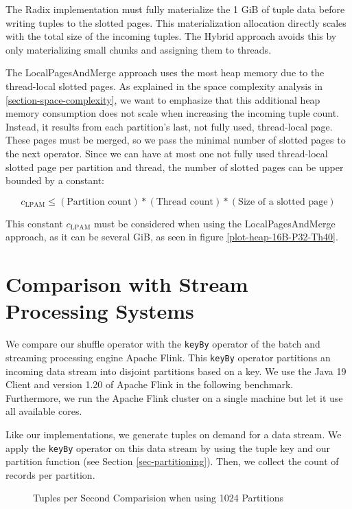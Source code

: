 The Radix implementation must fully materialize the 1 GiB of tuple data before writing tuples to the slotted pages.
This materialization allocation directly scales with the total size of the incoming tuples.
The Hybrid approach avoids this by only materializing small chunks and assigning them to threads.

The LocalPagesAndMerge approach uses the most heap memory due to the thread-local slotted pages.
As explained in the space complexity analysis in \ref{section-space-complexity}, we want to emphasize that this additional heap memory consumption does not scale when increasing the incoming tuple count.
Instead, it results from each partition's last, not fully used, thread-local page.
These pages must be merged, so we pass the minimal number of slotted pages to the next operator.
Since we can have at most one not fully used thread-local slotted page per partition and thread, the number of slotted pages can be upper bounded by a constant:

\begin{equation} c_\textrm{LPAM} \leq (\textrm{Partition count}) * (\textrm{Thread count}) * (\textrm{Size of a slotted page}) \end{equation}

This constant $c_\textrm{LPAM}$ must be considered when using the LocalPagesAndMerge approach, as it can be several GiB, as seen in figure \ref{plot-heap-16B-P32-Th40}.
\section{Comparison with Stream Processing Systems}
We compare our shuffle operator with the \texttt{keyBy} operator of the batch and streaming processing engine Apache Flink\cite{apache-flink}.
This \texttt{keyBy} operator partitions an incoming data stream into disjoint partitions based on a key.
We use the Java 19 Client and version 1.20 of Apache Flink in the following benchmark.
Furthermore, we run the Apache Flink cluster on a single machine but let it use all available cores.

Like our implementations, we generate tuples on demand for a data stream.
We apply the \texttt{keyBy} operator on this data stream by using the tuple key and our partition function (see Section \ref{sec-partitioning}).
Then, we collect the count of records per partition.
\begin{figure}[h]
  \centering
  \resizebox{.75\linewidth}{!}{}
  \caption[Tuples per Second Comparison Plot with Apache Flink]{Tuples per Second Comparision when using 1024 Partitions}
  \label{plot-apache-flink-comparison}
\end{figure}

